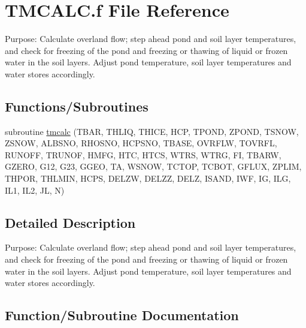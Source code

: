 \hypertarget{TMCALC_8f}{}\section{T\+M\+C\+A\+L\+C.\+f File Reference}
\label{TMCALC_8f}


Purpose\+: Calculate overland flow; step ahead pond and soil layer temperatures, and check for freezing of the pond and freezing or thawing of liquid or frozen water in the soil layers. Adjust pond temperature, soil layer temperatures and water stores accordingly.  


\subsection*{Functions/\+Subroutines}
\begin{DoxyCompactItemize}
\item 
subroutine \hyperlink{TMCALC_8f_a5ad5bd585e1ef7d89e9862d0bacd3c51}{tmcalc} (T\+B\+A\+R, T\+H\+L\+I\+Q, T\+H\+I\+C\+E, H\+C\+P, T\+P\+O\+N\+D, Z\+P\+O\+N\+D, T\+S\+N\+O\+W, Z\+S\+N\+O\+W, A\+L\+B\+S\+N\+O, R\+H\+O\+S\+N\+O, H\+C\+P\+S\+N\+O, T\+B\+A\+S\+E, O\+V\+R\+F\+L\+W, T\+O\+V\+R\+F\+L, R\+U\+N\+O\+F\+F, T\+R\+U\+N\+O\+F, H\+M\+F\+G, H\+T\+C, H\+T\+C\+S, W\+T\+R\+S, W\+T\+R\+G, F\+I, T\+B\+A\+R\+W, G\+Z\+E\+R\+O, G12, G23, G\+G\+E\+O, T\+A, W\+S\+N\+O\+W, T\+C\+T\+O\+P, T\+C\+B\+O\+T, G\+F\+L\+U\+X, Z\+P\+L\+I\+M, T\+H\+P\+O\+R, T\+H\+L\+M\+I\+N, H\+C\+P\+S, D\+E\+L\+Z\+W, D\+E\+L\+Z\+Z, D\+E\+L\+Z, I\+S\+A\+N\+D, I\+W\+F, I\+G, I\+L\+G, I\+L1, I\+L2, J\+L, N)
\end{DoxyCompactItemize}


\subsection{Detailed Description}
Purpose\+: Calculate overland flow; step ahead pond and soil layer temperatures, and check for freezing of the pond and freezing or thawing of liquid or frozen water in the soil layers. Adjust pond temperature, soil layer temperatures and water stores accordingly. 



\subsection{Function/\+Subroutine Documentation}
\hypertarget{TMCALC_8f_a5ad5bd585e1ef7d89e9862d0bacd3c51}{}
